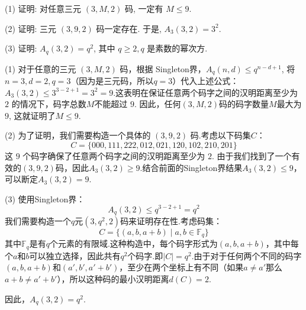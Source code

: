  \begin{tcolorbox}[breakable,colback=blue!5!white,colframe=blue!75!black,
 title= 解答题]

(1) 证明: 对任意三元 $ (3, M, 2) $ 码, 一定有 $ M \leq 9 $.

(2) 证明: 三元 $ (3,9,2) $ 码一定存在. 于是, $ A_{3}(3,2)=3^{2} $.

(3) 证明: $ A_{q}(3,2)=q^{2} $, 其中 $ q \geq 2, q $ 是素数的幂次方.

 \tcblower
(1) 对于任意的三元 $(3, M, 2)$ 码，根据 Singleton界，$A_q(n, d) \leq q^{n-d+1}$, 将$n=3, d=2, q=3$（因为是三元码，所以$q=3$）代入上述公式：
$A_3(3, 2) \leq 3^{3-2+1} = 3^{2} = 9$.这表明在保证任意两个码字之间的汉明距离至少为 $2$ 的情况下，码字总数$M$不能超过 $9$.
因此，任何$(3, M, 2)$码的码字数量$M$最大为 $9$, 这就证明了$M \leq 9$.

 (2) 为了证明，我们需要构造一个具体的 $(3,9,2)$ 码.考虑以下码集$C$：
$$C = \{000, 111, 222, 012, 021, 120, 102, 210, 201\}$$
这 $9$ 个码字确保了任意两个码字之间的汉明距离至少为 $2$. 由于我们找到了一个有效的$(3,9,2)$码，因此$A_3(3,2) \geq 9$.结合前面的Singleton界结果$A_3(3,2) \leq 9$，可以断定$A_3(3,2) = 9$.

 (3) 使用Singleton界：
\[ A_q(3, 2) \leq q^{3-2+1} = q^{2} \]
我们需要构造一个$q$元$(3, q^2, 2)$码来证明存在性.考虑码集：
\[ C = \{(a, b, a+b) \mid a, b \in \mathbb{F}_q\} \]
其中$\mathbb{F}_q$是有$q$个元素的有限域.这种构造中，每个码字形式为$(a, b, a+b)$，其中每个$a$和$b$可以独立选择，因此共有$q^2$个码字.即$|C| = q^2$.由于对于任何两个不同的码字$(a, b, a+b)$和$(a', b', a'+b')$，至少在两个坐标上有不同（如果$a \neq a'$那么$a+b \neq a'+b'$），所以这种码的最小汉明距离$d(C)=2$.

因此，$A_q(3, 2) = q^2$.
 \end{tcolorbox}


